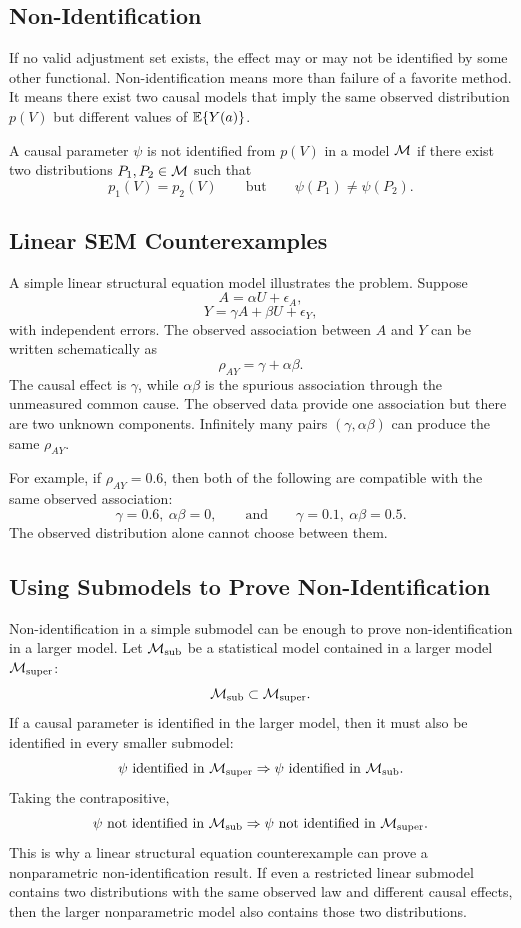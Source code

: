 \subsection{Non-Identification}

If no valid adjustment set exists, the effect may or may not be identified by
some other functional. Non-identification means more than failure of a favorite
method. It means there exist two causal models that imply the same observed
distribution $p(V)$ but different values of $\mathbb{E}\{Y(a)\}$.

\begin{definition}
A causal parameter $\psi$ is not identified from $p(V)$ in a model $\mathcal{M}$ if there
exist two distributions $P_1,P_2\in\mathcal{M}$ such that
\[
  p_1(V)=p_2(V)
  \qquad\text{but}\qquad
  \psi(P_1)\ne \psi(P_2).
\]
\end{definition}

\subsection{Linear SEM Counterexamples}

A simple linear structural equation model illustrates the problem. Suppose
\[
  A=\alpha U+\epsilon_A,
\]
\[
  Y=\gamma A+\beta U+\epsilon_Y,
\]
with independent errors. The observed association between $A$ and $Y$ can be
written schematically as
\[
  \rho_{AY}=\gamma+\alpha\beta.
\]
The causal effect is $\gamma$, while $\alpha\beta$ is the spurious association
through the unmeasured common cause. The observed data provide one association
but there are two unknown components. Infinitely many pairs
$(\gamma,\alpha\beta)$ can produce the same $\rho_{AY}$.

For example, if $\rho_{AY}=0.6$, then both of the following are compatible with
the same observed association:
\[
  \gamma=0.6,\ \alpha\beta=0,
  \qquad\text{and}\qquad
  \gamma=0.1,\ \alpha\beta=0.5.
\]
The observed distribution alone cannot choose between them.

\subsection{Using Submodels to Prove Non-Identification}

Non-identification in a simple submodel can be enough to prove
non-identification in a larger model. Let $\mathcal{M}_{\mathrm{sub}}$ be a statistical
model contained in a larger model $\mathcal{M}_{\mathrm{super}}$:
\[
  \mathcal{M}_{\mathrm{sub}}\subset \mathcal{M}_{\mathrm{super}}.
\]
If a causal parameter is identified in the larger model, then it must also be
identified in every smaller submodel:
\[
  \psi \text{ identified in } \mathcal{M}_{\mathrm{super}}
  \Rightarrow
  \psi \text{ identified in } \mathcal{M}_{\mathrm{sub}}.
\]
Taking the contrapositive,
\[
  \psi \text{ not identified in } \mathcal{M}_{\mathrm{sub}}
  \Rightarrow
  \psi \text{ not identified in } \mathcal{M}_{\mathrm{super}}.
\]
This is why a linear structural equation counterexample can prove a
nonparametric non-identification result. If even a restricted linear submodel
contains two distributions with the same observed law and different causal
effects, then the larger nonparametric model also contains those two
distributions.

